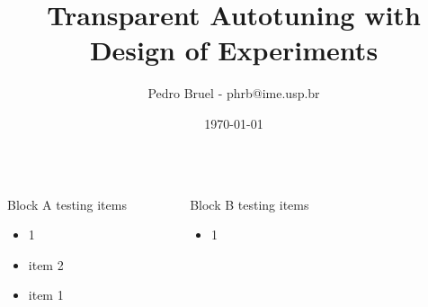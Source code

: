 \documentclass[14pt, compress, aspectratio=169, xcolor={table,usenames,dvipsnames}]{beamer}
\author{Pedro Bruel - phrb@ime.usp.br}
\date{\today}
\title{Transparent Autotuning with Design of Experiments}
\renewcommand\maketitle{}
\begin{document}
\maketitle

\begin{frame}
\begin{columns}
\begin{column}{0.9\columnwidth}
\begin{columns}
\begin{column}{0.48\columnwidth}
\begin{block}{Block A}
testing items

\begin{itemize}
\item 1
\item item 2
\item item 1
\end{itemize}
\end{block}
\end{column}
\begin{column}{0.48\columnwidth}
\begin{block}{Block B}
testing items

\begin{itemize}
\item 1
\end{itemize}
\end{block}
\end{column}
\end{columns}
\end{column}
\begin{column}{0.1\columnwidth}
\end{column}
\end{columns}
\end{frame}
\end{document}
